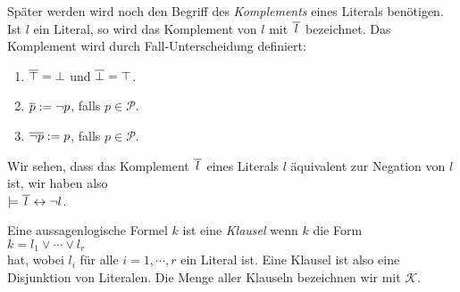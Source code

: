 Sp\"{a}ter werden wird noch den Begriff des \emph{Komplements} eines Literals ben\"{o}tigen.
Ist $l$ ein Literal, so wird das Komplement von $l$ mit $\overline{\,l\,}$
bezeichnet.  Das Komplement wird durch Fall-Unterscheidung definiert:
\begin{enumerate}
\item $\overline{\top} = \bot$ \quad und \quad $\overline{\bot} = \top$. 
\item $\overline{p} := \neg p$, \quad falls $p \in \mathcal{P}$.
\item $\overline{\neg p} := p$, \quad falls $p \in \mathcal{P}$.
\end{enumerate}
Wir sehen, dass das Komplement $\overline{\,l\,}$ eines Literals $l$ \"{a}quivalent zur
Negation von $l$ ist, wir haben also
\\[0.2cm]
\hspace*{1.3cm}
$\models \overline{\,l\,} \leftrightarrow \neg l$.

\begin{Definition}[Klausel]
  Eine aussagenlogische Formel $k$ ist eine \emph{Klausel} wenn $k$ die Form \\[0.2cm]
  \hspace*{1.3cm} $k = l_1 \vee \cdots \vee l_r$ \\[0.2cm]
  hat, wobei $l_i$ f\"{u}r alle $i=1,\cdots,r$ ein Literal ist.  Eine Klausel ist also eine
  Disjunktion von Literalen. 
  Die Menge aller Klauseln bezeichnen wir mit $\mathcal{K}$.
  \eox
\end{Definition}

